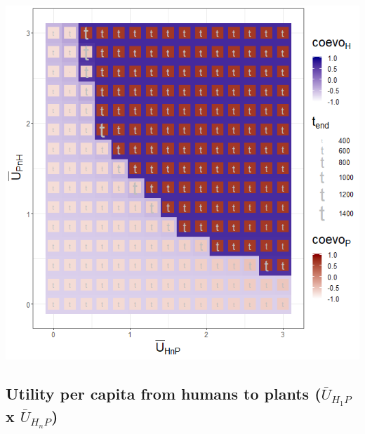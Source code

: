 \documentclass[
]{book}
\begin{document}

\includegraphics[width=1\linewidth]{plots/3_twoPar-mU.HnP-mU.PnH_plot}

\newpage

\hypertarget{utility-per-capita-from-humans-to-plants-baru_h_1p-x-baru_h_np}{%
\subsection{\texorpdfstring{Utility per capita from humans to plants (\(\bar{U}_{H_{1}P}\) x \(\bar{U}_{H_{n}P}\))}{Utility per capita from humans to plants (\textbackslash bar\{U\}\_\{H\_\{1\}P\} x \textbackslash bar\{U\}\_\{H\_\{n\}P\})}}\label{utility-per-capita-from-humans-to-plants-baru_h_1p-x-baru_h_np}}

\end{document}
